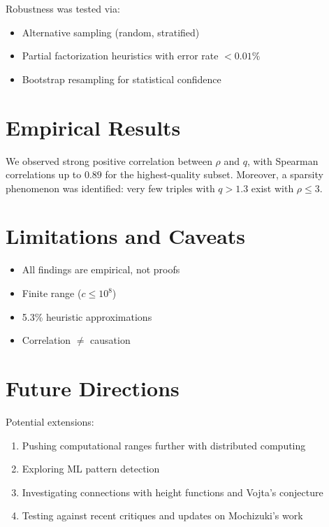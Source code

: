 \documentclass[11pt,a4paper]{article}
\begin{document}
Robustness was tested via:
\begin{itemize}
    \item Alternative sampling (random, stratified)
    \item Partial factorization heuristics with error rate $<0.01\%$
    \item Bootstrap resampling for statistical confidence
\end{itemize}

\section{Empirical Results}

We observed strong positive correlation between $\rho$ and $q$, with Spearman correlations up to $0.89$ for the highest-quality subset. Moreover, a sparsity phenomenon was identified: very few triples with $q > 1.3$ exist with $\rho \leq 3$.

\section{Limitations and Caveats}

\begin{itemize}
    \item All findings are empirical, not proofs
    \item Finite range ($c \leq 10^8$)
    \item 5.3\% heuristic approximations
    \item Correlation $\neq$ causation
\end{itemize}

\section{Future Directions}

Potential extensions:
\begin{enumerate}
    \item Pushing computational ranges further with distributed computing
    \item Exploring ML pattern detection \citep{allen2021abcml}
    \item Investigating connections with height functions and Vojta’s conjecture \citep{vojta1987diophantine}
    \item Testing against recent critiques and updates on Mochizuki’s work \citep{joshi2025abcupdate}
\end{enumerate}
\end{document}

